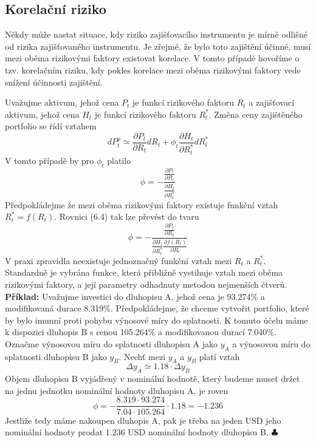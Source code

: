 \documentclass[a4paper]{book}
\begin{document}
\subsection{Korelační riziko}

Někdy může nastat situace, kdy riziko zajišťovacího instrumentu je mírně odlišné od rizika zajišťovaného instrumentu. Je zřejmé, že bylo toto zajištění účinné, musí mezi oběma rizikovými faktory existovat korelace. V tomto případě hovoříme o tzv. korelačním riziku, kdy pokles korelace mezi oběma rizikovými faktory vede snížení účinnosti zajištění.

Uvažujme aktivum, jehož cena $P_t$ je funkcí rizikového faktoru $R_t$ a zajišťovací aktivum, jehož cena $H_t$ je funkcí rizikového faktoru $R_t^*$. Změna ceny zajištěného portfolio se řídí vztahem
\begin{equation*}
dP_t^p \simeq \frac{\partial P_t}{\partial R_t}dR_t + \phi_t \frac{\partial H_t}{\partial R_t^*}dR_t^*
\end{equation*}
V tomto případě by pro $\phi_t$ platilo
\begin{equation}
\phi = -\frac{\frac{\partial P_t}{\partial R_t}}{\frac{\partial H_t}{\partial R_t^*}}
\end{equation}
Předpokládejme že mezi oběma rizikovými faktory existuje funkční vztah $R_t^* = f(R_t)$. Rovnici (6.4) tak lze převést do tvaru
\begin{equation*}
\phi = -\frac{\frac{\partial P_t}{\partial R_t}}{\frac{\partial H_t}{\partial R_t^*}\frac{\partial f(R_t)}{\partial R_t}}
\end{equation*}
V praxi zpravidla neexistuje jednoznačný funkční vztah mezi $R_t$ a $R_t^*$. Standardně je vybrána funkce, která přibližně vystihuje vztah mezi oběma rizikovými faktory, a její parametry odhadnuty metodou nejmenších čtverů.\\

\noindent \textbf{Příklad:} Uvažujme investici do dluhopisu A, jehož cena je 93.274\% a modifikovaná durace 8.319\%. Předpokládejme, že chceme vytvořit portfolio, které by bylo imunní proti pohybu výnosové míry do splatnosti. K tomuto účelu máme k dispozici dluhopis B s cenou 105.264\% a modifikovanou durací 7.040\%. Označme výnosovou míru do splatnosti dluhopisu A jako $y_A$ a výnosovou míru do splatnosti dluhopisu B jako $y_B$. Nechť mezi $y_A$ a $y_B$ platí vztah
\begin{equation*}
\Delta y_A \simeq 1.18 \cdot \Delta y_B
\end{equation*}
Objem dluhopisu B vyjádřený v nominální hodnotě, který budeme muset držet na jednu jednotku nominální hodnoty dluhopisu A, je roven
\begin{equation*}
\phi = -\frac{8.319 \cdot 93.274}{7.04 \cdot 105.264} \cdot 1.18 = -1.236
\end{equation*}
Jestliže tedy máme nakoupen dluhopis A, pak je třeba na jeden USD jeho nominální hodnoty prodat 1.236 USD nominální hodnoty dluhopisu B. $\clubsuit$
\end{document}
